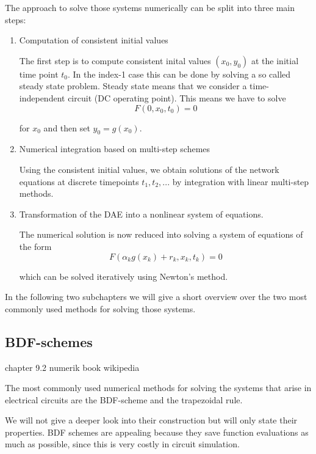The approach to solve those systems numerically can be split into three main steps:
\begin{enumerate}
	\item Computation of consistent initial values
	
	The first step is to compute consistent inital values $(x_0, y_0)$ at the initial time point $t_0$. In the index-1 case this can be done by solving a so called steady state problem. Steady state means that we consider a time-independent circuit (DC operating point). This means we have to solve
	\begin{displaymath}
		F(0,x_0,t_0) = 0
	\end{displaymath}
	
	for $x_0$ and then set $y_0 = g(x_0)$.
	
	\item Numerical integration based on multi-step schemes
	
	Using the consistent initial values, we obtain solutions of the network equations at discrete timepoints $t_1, t_2, ...$ by integration with linear multi-step methods.
	
	\item Transformation of the DAE into a nonlinear system of equations. 
	
	The numerical solution is now reduced into solving a system of equations of the form
	\begin{displaymath}
		F(\alpha_k g(x_k) + r_k, x_k, t_k) = 0
	\end{displaymath}
	
	which can be solved iteratively using Newton's method.
\end{enumerate}

In the following two subchapters we will give a short overview over the two most commonly used methods for solving those systems.

\subsection{BDF-schemes}
	chapter 9.2 numerik book
	wikipedia
	
	The most commonly used numerical methods for solving the systems that arise in electrical circuits are the BDF-scheme and the trapezoidal rule. 
	
	We will not give a deeper look into their construction but will only state their properties. BDF schemes are appealing because they save function evaluations as much as possible, since this is very costly in circuit simulation.
	
